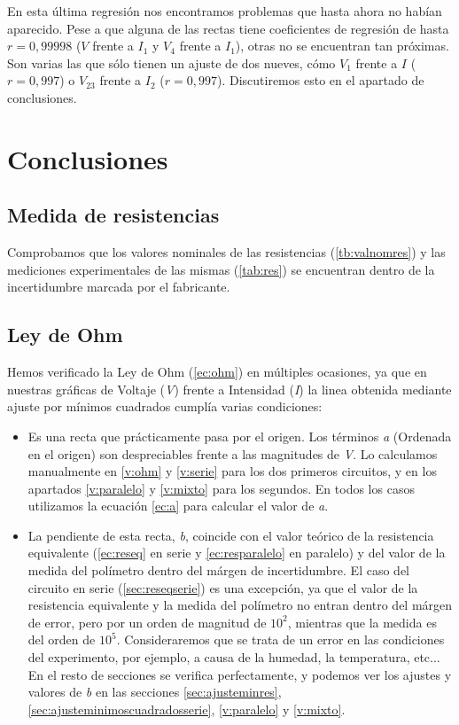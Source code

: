 \documentclass[12pt, a4paper, titlepage]{article}
\begin{document}
  En esta última regresión nos encontramos problemas que hasta ahora no habían aparecido. Pese a que alguna de las rectas tiene coeficientes de regresión de hasta $r = 0,99998$ ($V$ frente a $I_1$ y $V_4$ frente a $I_1$), otras no se encuentran tan próximas. Son varias las que sólo tienen un ajuste de dos nueves, cómo $V_1$ frente a $I$ ($r = 0,997$) o $V_{23}$ frente a $I_2$ ($r = 0,997$). Discutiremos esto en el apartado de conclusiones.


  \newpage
  \section{Conclusiones}

  \subsection{Medida de resistencias}

  Comprobamos que los valores nominales de las resistencias (\ref{tb:valnomres}) y las mediciones experimentales de las mismas (\ref{tab:res}) se encuentran dentro de la incertidumbre marcada por el fabricante.

  \subsection{Ley de Ohm}

  Hemos verificado la Ley de Ohm (\ref{ec:ohm}) en múltiples ocasiones, ya que en nuestras gráficas de Voltaje (\textit{V}) frente a Intensidad (\textit{I}) la linea obtenida mediante ajuste por mínimos cuadrados cumplía varias condiciones:

  \begin{itemize}[label=$-$]
    \item Es una recta que prácticamente pasa por el origen. Los términos \textit{a} (Ordenada en el origen) son despreciables frente a las magnitudes de \textit{V}. Lo calculamos manualmente en \ref{v:ohm} y \ref{v:serie} para los dos primeros circuitos, y en los apartados \ref{v:paralelo} y \ref{v:mixto} para los segundos. En todos los casos utilizamos la ecuación \ref{ec:a} para calcular el valor de \textit{a}.
    \item La pendiente de esta recta, \textit{b}, coincide con el valor teórico de la resistencia equivalente (\ref{ec:reseq} en serie y \ref{ec:resparalelo} en paralelo) y del valor de la medida del polímetro dentro del márgen de incertidumbre. El caso del circuito en serie (\ref{sec:reseqserie}) es una excepción, ya que el valor de la resistencia equivalente y la medida del polímetro no entran dentro del márgen de error, pero por un orden de magnitud de $10^2$, mientras que la medida es del orden de $10^5$. Consideraremos que se trata de un error en las condiciones del experimento, por ejemplo, a causa de la humedad, la temperatura, etc... En el resto de secciones se verifica perfectamente, y podemos ver los ajustes y valores de \textit{b} en las secciones \ref{sec:ajusteminres}, \ref{sec:ajusteminimoscuadradosserie}, \ref{v:paralelo} y \ref{v:mixto}.
  \end{itemize}
\end{document}
